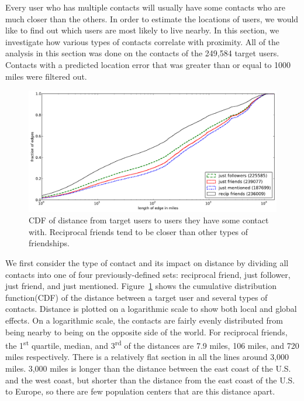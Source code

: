 \label{sec:analysis}

Every user who has multiple contacts will usually have some contacts who are
much closer than the others.
%
In order to estimate the locations of users, we would like
to find out which users are most likely to live nearby.
%
In this section, we investigate how various types of contacts correlate with
proximity.
%
All of the analysis in this section was done on the contacts of the 249,584
target users.
%
Contacts with a predicted location error that was greater than or equal to 1000
miles were filtered out.

\begin{figure}[tbh]
\centering
\includegraphics[width=\linewidth]{figures/edge_types_cuml.pdf}
\caption{
CDF of distance from target users to users they have some contact
with.
%
Reciprocal friends tend to be closer than other types of friendships.
}
\label{fig:EdgeTypesCuml}
\end{figure}

\label{sec:EdgeTypes}

We first consider the type of contact and its impact on distance by dividing
all contacts into one of four previously-defined sets:
 reciprocal friend, just follower, just friend, and just mentioned.
%
Figure~\ref{fig:EdgeTypesCuml} shows the cumulative distribution
function(CDF) of the distance between a target user and several types of
contacts.
%
Distance is plotted on a logarithmic scale to show both local and
global effects.
%
On a logarithmic scale, the contacts are fairly evenly distributed from being
nearby to being on the opposite side of the world.
%
For reciprocal friends, the 1\textsuperscript{st} quartile, median, and
3\textsuperscript{rd} of the distances are 7.9 miles, 106 miles, and 720 miles
respectively.
%
There is a relatively flat section in all the lines around 3,000 miles.
%
3,000 miles is longer than the distance between the east coast of the U.S. and
the west coast, but shorter than the distance from the east coast of the U.S.
to Europe, so there are few population centers that are this distance apart.

